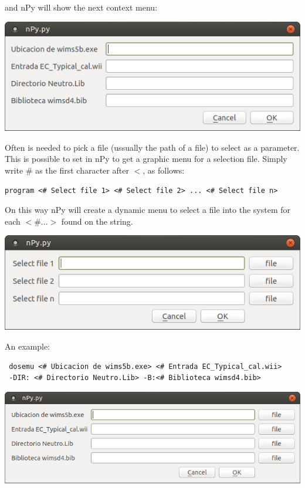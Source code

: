 \documentclass[a4paper,10pt]{article}
\begin{document}
 \noindent and nPy will show the next context menu:
\begin{center}
 \includegraphics[width=\textwidth]{img/contextMenuString.png}
\end{center}

\bigskip 

Often is needed to pick a file (ussually the path of a file) to select as a parameter. This is possible to set in nPy to get a graphic menu for a selection file. Simply write $\#$ as the first character after $<$, as follows: 

\begin{verbatim}
program <# Select file 1> <# Select file 2> ... <# Select file n>
 \end{verbatim}

On this way nPy will create a dynamic menu to select a file into the system for each $<\# ...>$ found on the 
string.

\begin{center}
 \includegraphics[width=\textwidth]{img/contextMenuExampleFile.png}
\end{center}

\noindent An example:

\begin{verbatim}
 dosemu <# Ubicacion de wims5b.exe> <# Entrada EC_Typical_cal.wii> 
 -DIR: <# Directorio Neutro.Lib> -B:<# Biblioteca wimsd4.bib>
 \end{verbatim}

\begin{center}
 \includegraphics[width=\textwidth]{img/contextMenuFile.png}
\end{center}
\end{document}
